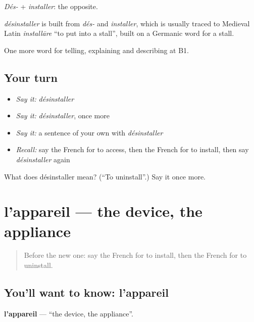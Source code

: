 \emph{Dés-} + \emph{installer}: the opposite.

\begin{cousinweb}
\emph{désinstaller} is built from \emph{dés-} and \emph{installer}, which is usually traced to Medieval Latin \emph{installāre} \textquotedblleft{}to put into a stall\textquotedblright{}, built on a Germanic word for a stall.
\end{cousinweb}

\begin{grammarlens}[title={What you've built}]
One more word for telling, explaining and describing at B1.
\end{grammarlens}

\subsection*{Your turn}
\begin{itemize}
\raggedright
  \item \emph{Say it:} \emph{désinstaller}
  \item \emph{Say it:} \emph{désinstaller}, once more
  \item \emph{Say it:} a sentence of your own with \emph{désinstaller}
  \item \emph{Recall:} say the French for to access, then the French for to install, then say \emph{désinstaller} again
\end{itemize}

\begin{tcolorbox}[breakable,colback=teal!4,colframe=teal!35!black,title={Before you move on}]
What does désinstaller mean? (\textquotedblleft{}To uninstall\textquotedblright{}.) Say it once more.
\end{tcolorbox}
\section[l'appareil]{l'appareil — the device, the appliance}

\label{lesson:FR-C396-appareil}



\begin{quote}
Before the new one: say the French for to install, then the French for to uninstall.
\end{quote}

\subsection*{You'll want to know: l'appareil}
\textbf{l'appareil} — \textquotedblleft{}the device, the appliance\textquotedblright{}.

